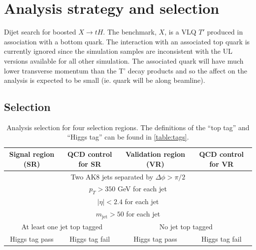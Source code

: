 \documentclass[10pt,oneside]{article}
\begin{document}
\maketitle
\tableofcontents
\section{Analysis strategy and selection}

Dijet search for boosted $X \to tH$. The benchmark, $X$, is a VLQ $T'$ produced
in association with a bottom quark. The interaction with an associated top quark
is currently ignored since the simulation samples are inconsistent with the UL
versions available for all other simulation. The associated quark will have 
much lower transverse momentum than the T' decay products and so the affect on
the analysis is expected to be small (ie. quark will be along beamline).

\subsection{Selection}
\begin{table}[H]
    \centering
    \begin{tabular}{|c |c |c |c|}
        \hline
        Signal region (SR) & QCD control for SR & Validation region (VR) & QCD control for VR \\
        \hline
        \multicolumn{4}{|c|}{Two AK8 jets separated by $\Delta \phi > \pi/2$} \\
        \multicolumn{4}{|c|}{$p_T > 350$ GeV for each jet} \\
        \multicolumn{4}{|c|}{$|\eta| < 2.4$ for each jet} \\
        \multicolumn{4}{|c|}{$m_{\mathrm{jet}} > 50$ for each jet} \\
        \hline
        \multicolumn{2}{|c|}{At least one jet top tagged} & \multicolumn{2}{|c|}{No jet top tagged} \\
        \hline
        \multicolumn{1}{|c|}{Higgs tag pass} & \multicolumn{1}{|c|}{Higgs tag fail} & \multicolumn{1}{|c|}{Higgs tag pass} & \multicolumn{1}{|c|}{Higgs tag fail} \\
        \hline
    \end{tabular} 
    \caption{Analysis selection for four selection regions. The definitions of the ``top tag'' and ``Higgs tag'' can be
    found in \ref{table:tags}.}
    \label{table:selection}
\end{table}
\end{document}
